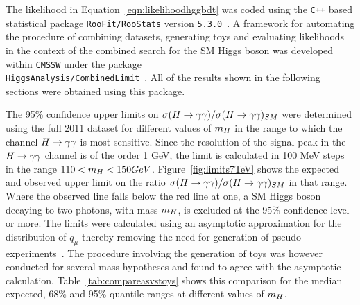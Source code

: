 The likelihood in Equation~\ref{eqn:likelihoodhggbdt} was coded using the \texttt{C++} based 
statistical package \texttt{RooFit/RooStats} version \texttt{5.3.0}~\citep{roofit}. 
A framework for automating the procedure of combining datasets, generating toys
and evaluating likelihoods in the context of the combined search for the SM Higgs boson
was developed within \texttt{CMSSW} 
under the package \\
\texttt{HiggsAnalysis/CombinedLimit}~\citep{combinationstwiki}.
All of the results shown in the following sections were obtained using this package.

The 95\% confidence upper limits on $\sigma(H\rightarrow\gamma\gamma)/\sigma(H\rightarrow\gamma\gamma)_{SM}$ were determined using the full 2011 dataset 
for different values of $m_{H}$ in the range to which the channel $H\rightarrow\gamma\gamma$ is most sensitive.
Since the resolution of the signal peak in the $H\rightarrow\gamma\gamma$ channel is of the order 1 GeV, the limit is calculated
in 100 MeV steps in the range $110 < m_{H} < 150 GeV$. Figure~\ref{fig:limits7TeV} shows the expected and observed
upper limit on the ratio $\sigma(H\rightarrow\gamma\gamma)/\sigma(H\rightarrow\gamma\gamma)_{SM}$ in that range. Where the observed line falls below the red line
at one, a SM Higgs boson decaying to two photons, with mass $m_{H}$, is excluded at the 95\% confidence level or more. 
The limits were calculated using an asymptotic approximation for the distribution of $q_{\mu}$ thereby 
removing the need for generation of pseudo-experiments~\citep{asimov}. The procedure involving the generation of toys
was however conducted for several mass hypotheses and found to agree
with the asymptotic calculation. Table~\ref{tab:compareasvstoys} shows this comparison 
for the median expected, 68\% and 95\% quantile ranges at different values of $m_{H}$.

